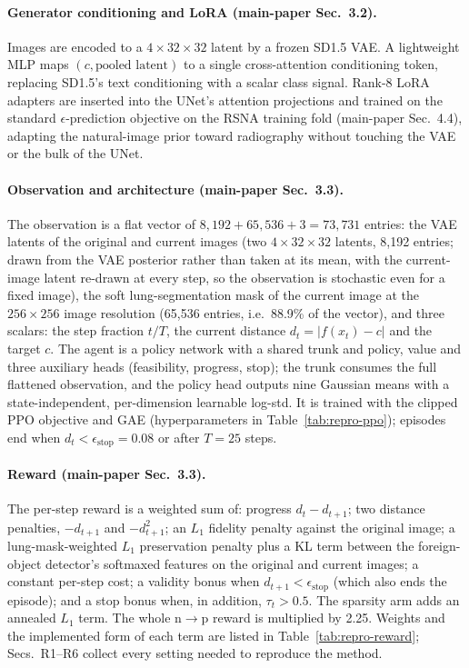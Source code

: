 \paragraph{Generator conditioning and LoRA (main-paper Sec.~3.2).} Images are encoded to a $4\times32\times32$ latent by a frozen SD1.5 VAE. A lightweight MLP maps $(c, \text{pooled latent})$ to a single cross-attention conditioning token, replacing SD1.5's text conditioning with a scalar class signal. Rank-8 LoRA adapters are inserted into the UNet's attention projections and trained on the standard $\epsilon$-prediction objective on the RSNA training fold (main-paper Sec.~4.4), adapting the natural-image prior toward radiography without touching the VAE or the bulk of the UNet.

\paragraph{Observation and architecture (main-paper Sec.~3.3).} The observation is a flat vector of $8{,}192 + 65{,}536 + 3 = 73{,}731$ entries: the VAE latents of the original and current images (two $4 \times 32 \times 32$ latents, 8{,}192 entries; drawn from the VAE posterior rather than taken at its mean, with the current-image latent re-drawn at every step, so the observation is stochastic even for a fixed image), the soft lung-segmentation mask of the current image at the $256 \times 256$ image resolution (65{,}536 entries, i.e.\ 88.9\% of the vector), and three scalars: the step fraction $t/T$, the current distance $d_t = |f(x_t) - c|$ and the target $c$. The agent is a policy network with a shared trunk and policy, value and three auxiliary heads (feasibility, progress, stop); the trunk consumes the full flattened observation, and the policy head outputs nine Gaussian means with a state-independent, per-dimension learnable log-std. It is trained with the clipped PPO objective and GAE (hyperparameters in Table~\ref{tab:repro-ppo}); episodes end when $d_t < \epsilon_{\text{stop}} = 0.08$ or after $T = 25$ steps.

\paragraph{Reward (main-paper Sec.~3.3).} The per-step reward is a weighted sum of: progress $d_t - d_{t+1}$; two distance penalties, $-d_{t+1}$ and $-d_{t+1}^2$; an $L_1$ fidelity penalty against the original image; a lung-mask-weighted $L_1$ preservation penalty plus a KL term between the foreign-object detector's softmaxed features on the original and current images; a constant per-step cost; a validity bonus when $d_{t+1} < \epsilon_{\text{stop}}$ (which also ends the episode); and a stop bonus when, in addition, $\tau_t > 0.5$. The sparsity arm adds an annealed $L_1$ term. The whole n$\to$p reward is multiplied by 2.25. Weights and the implemented form of each term are listed in Table~\ref{tab:repro-reward}; Secs.~R1--R6 collect every setting needed to reproduce the method.

